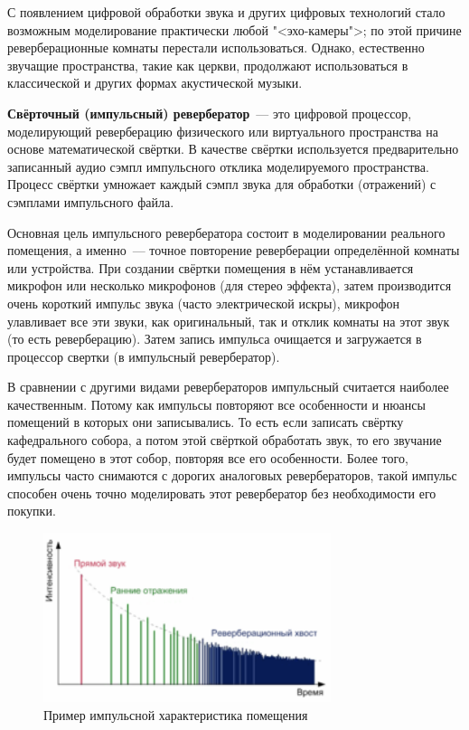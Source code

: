 \documentclass[oneside, final, 14pt]{extreport}
\begin{document}
С появлением цифровой обработки звука и других цифровых технологий стало возможным моделирование практически любой "<эхо-камеры">; по этой причине реверберационные комнаты перестали использоваться. Однако, естественно звучащие пространства, такие как церкви, продолжают использоваться в классической и других формах акустической музыки.

\textbf{Свёрточный (импульсный) ревербератор}~--- это цифровой процессор, моделирующий реверберацию физического или виртуального пространства на основе математической свёртки. В качестве свёртки используется предварительно записанный аудио сэмпл импульсного отклика моделируемого пространства. Процесс свёртки умножает каждый сэмпл звука для обработки (отражений) с сэмплами импульсного файла.

Основная цель импульсного ревербератора состоит в моделировании реального помещения, а именно~--- точное повторение реверберации определённой комнаты или устройства. При создании свёртки помещения в нём устанавливается микрофон или несколько микрофонов (для стерео эффекта), затем производится очень короткий импульс звука (часто электрической искры), микрофон улавливает все эти звуки, как оригинальный, так и отклик комнаты на этот звук (то есть реверберацию). Затем запись импульса очищается и загружается в процессор свертки (в импульсный ревербератор).

В сравнении с другими видами ревербераторов импульсный считается наиболее качественным. Потому как импульсы повторяют все особенности и нюансы помещений в которых они записывались. То есть если записать свёртку кафедрального собора, а потом этой свёрткой обработать звук, то его звучание будет помещено в этот собор, повторяя все его особенности. Более того, импульсы часто снимаются с дорогих аналоговых ревербераторов, такой импульс способен очень точно моделировать этот ревербератор без необходимости его покупки.

\begin{figure}[h!]
  \centering
  \includegraphics[width=0.75\textwidth]{pic-echochamber-02}
  \caption{Пример импульсной характеристика помещения}
  \label{pic-echochamber-02}
\end{figure}
	
\end{document}
